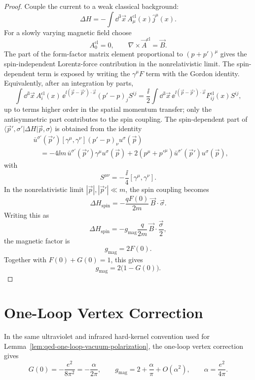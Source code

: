 \begin{proof}
Couple the current to a weak classical background:
\[
  \Delta H
  =
  -\int\dd^3\vec x\,A_\mu^{\mathrm{cl}}(x)\widehat j^\mu(x).
\]
For a slowly varying magnetic field choose
\[
  A_0^{\mathrm{cl}}=0,\qquad
  \nabla\times\vec A^{\mathrm{cl}}=\vec B .
\]
The part of the form-factor matrix element proportional to
\((p+p')^\mu\) gives the spin-independent Lorentz-force contribution in the
nonrelativistic limit.  The spin-dependent term is exposed by writing the
\(\gamma^\mu F\) term with the Gordon identity.  Equivalently, after an
integration by parts,
\[
  \int\dd^3\vec x\,
  A_i^{\mathrm{cl}}(x)\,
  \ee^{\ii(\vec p-\vec p')\cdot\vec x}(p'-p)_jS^{ij}
  =
  \frac{\ii}{2}\int\dd^3\vec x\,
  \ee^{\ii(\vec p-\vec p')\cdot\vec x}
  F^{\mathrm{cl}}_{ij}(x)S^{ij},
\]
up to terms higher order in the spatial momentum transfer; only the
antisymmetric part contributes to the spin coupling.
The spin-dependent part of
\(\langle\vec p',\sigma'|\Delta H|\vec p,\sigma\rangle\) is obtained from
the identity
\[
\begin{aligned}
  &\bar u^{\sigma'}(\vec p')
  [\gamma^\mu,\gamma^\nu](p'-p)_\nu
  u^\sigma(\vec p)  \\
  &\quad =
  -4\ii m\,\bar u^{\sigma'}(\vec p')\gamma^\mu u^\sigma(\vec p)
  +2(p^\mu+p'^\mu)
  \bar u^{\sigma'}(\vec p')u^\sigma(\vec p),
\end{aligned}
\]
with
\[
  S^{\mu\nu}=-\frac{\ii}{4}[\gamma^\mu,\gamma^\nu].
\]
In the nonrelativistic limit \(|\vec p|,|\vec p'|\ll m\), the spin
coupling becomes
\[
  \Delta H_{\mathrm{spin}}
  =
  -\frac{qF(0)}{2m}\,\vec B\cdot\vec\sigma .
\]
Writing this as
\[
  \Delta H_{\mathrm{spin}}
  =
  -g_{\mathrm{mag}}\frac{q}{2m}\,
  \vec B\cdot\frac{\vec\sigma}{2},
\]
the magnetic factor is
\[
  g_{\mathrm{mag}}=2F(0).
\]
Together with \(F(0)+G(0)=1\), this gives
\[
  g_{\mathrm{mag}}=2\bigl(1-G(0)\bigr).
\]
\end{proof}

\section{One-Loop Vertex Correction}

\begin{proposition}
\label{prop:qed-one-loop-vertex-schwinger}
In the same ultraviolet and infrared hard-kernel convention used for
Lemma~\ref{lem:qed-one-loop-vacuum-polarization}, the one-loop vertex
correction gives
\[
  G(0)=-\frac{e^2}{8\pi^2}=-\frac{\alpha}{2\pi},
  \qquad
  g_{\mathrm{mag}}
  =
  2+\frac{\alpha}{\pi}+O(\alpha^2),
  \qquad
  \alpha=\frac{e^2}{4\pi}.
\]
\end{proposition}

